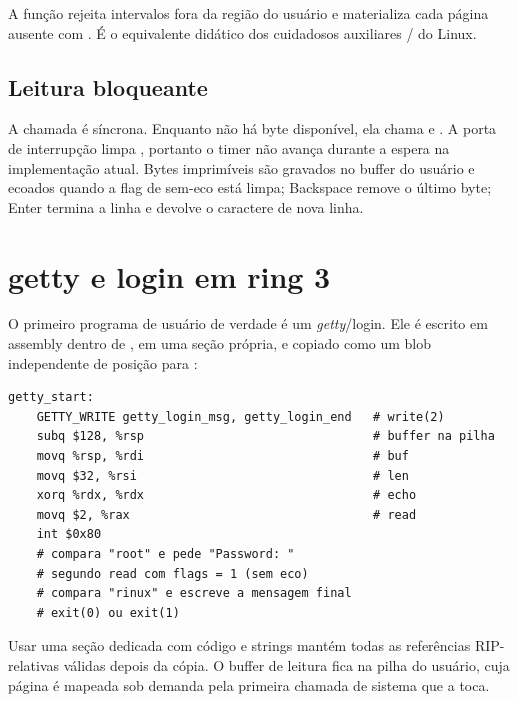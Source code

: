 A fun\c{c}\~ao rejeita intervalos fora da regi\~ao do usu\'ario e materializa
cada p\'agina ausente com . \'E o equivalente
did\'atico dos cuidadosos auxiliares /
do Linux.

\subsection{Leitura bloqueante}

A chamada  \'e s\'incrona. Enquanto n\~ao h\'a byte dispon\'ivel,
ela chama  e . A porta de interrup\c{c}\~ao
limpa , portanto o timer n\~ao avança durante a espera na
implementa\c{c}\~ao atual. Bytes imprim\'iveis s\~ao gravados no buffer do
usu\'ario e ecoados quando a flag de sem-eco est\'a limpa; Backspace remove o
\'ultimo byte; Enter termina a linha e devolve o caractere de nova linha.

\section{getty e login em ring 3}

O primeiro programa de usu\'ario de verdade \'e um \emph{getty}/login. Ele \'e
escrito em assembly dentro de , em uma se\c{c}\~ao pr\'opria, e
copiado como um blob independente de posi\c{c}\~ao para
:

\begin{lstlisting}[caption={Fluxo de login do programa em ring 3.},label={lst:gettyasm}]
getty_start:
    GETTY_WRITE getty_login_msg, getty_login_end   # write(2)
    subq $128, %rsp                                # buffer na pilha
    movq %rsp, %rdi                                # buf
    movq $32, %rsi                                 # len
    xorq %rdx, %rdx                                # echo
    movq $2, %rax                                  # read
    int $0x80
    # compara "root" e pede "Password: "
    # segundo read com flags = 1 (sem eco)
    # compara "rinux" e escreve a mensagem final
    # exit(0) ou exit(1)
\end{lstlisting}

Usar uma se\c{c}\~ao dedicada com c\'odigo e strings mant\'em todas as
refer\^encias RIP-relativas v\'alidas depois da c\'opia. O buffer de leitura
fica na pilha do usu\'ario, cuja p\'agina \'e mapeada sob demanda pela primeira
chamada de sistema que a toca.

